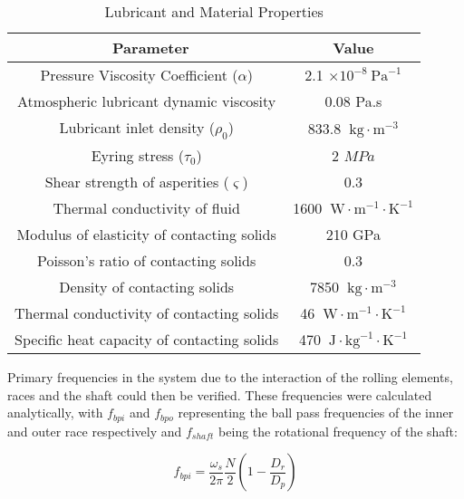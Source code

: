 \begin{table*}
	\caption{Lubricant and Material Properties}
	\label{Lubricant and Material Properties}
	\centering
	\renewcommand{\arraystretch}{1.5}%
	\begin{tabular}{|c|c|}
		\hline
		\ \textbf{Parameter} & \textbf{Value} \\ [0.5ex]
		\hline
		Pressure Viscosity Coefficient ($\alpha$) & 2.1 $\times 10^{-8}\mathrm{~Pa}^{-1}$ \\ [0.5ex]
		\hline
		Atmospheric lubricant dynamic viscosity & 0.08 Pa.s \\ [0.5ex]
		\hline
		Lubricant inlet density ($\rho_0$) & 833.8 $\mathrm{~kg}\cdot\mathrm{m}^{-3}$ \\ [0.5ex]
		\hline
		Eyring stress ($\tau_0$) & 2 $MPa$ \\ [0.5ex]
		\hline
		Shear strength of asperities ($\varsigma$) & 0.3 \\ [0.5ex]
		\hline
		Thermal conductivity of fluid & 1600 $\mathrm{~W}\cdot\mathrm{m}^{-1}\cdot\mathrm{K}^{-1}$ \\ [0.5ex]
		\hline
		Modulus of elasticity of contacting solids & 210 GPa \\ [0.5ex]
		\hline
		Poisson’s ratio of contacting solids & 0.3 \\ [0.5ex]
		\hline
        Density of contacting solids & 7850 $\mathrm{~kg}\cdot\mathrm{m}^{-3}$ \\ [0.5ex]
		\hline
		Thermal conductivity of contacting solids & 46 $\mathrm{~W}\cdot\mathrm{m}^{-1}\cdot\mathrm{K}^{-1}$ \\ [0.5ex]
		\hline
		Specific heat capacity of contacting solids & 470 $\mathrm{~J}\cdot\mathrm{kg}^{-1}\cdot\mathrm{K}^{-1}$ \\ [0.5ex]
		\hline
	\end{tabular}
\end{table*}

Primary frequencies in the system due to the interaction of the rolling elements, races and the shaft could then be verified. These frequencies were calculated analytically, with $f_{bpi}$ and $f_{bpo}$ representing the ball pass frequencies of the inner and outer race respectively and $f_{shaft}$ being the rotational frequency of the shaft:

\begin{equation}\label{ball pass frequency inner}
	f_{b p i}=\frac{\omega_s}{2 \pi} \frac{N}{2}\left(1-\frac{D_r}{D_p}\right)
\end{equation}


